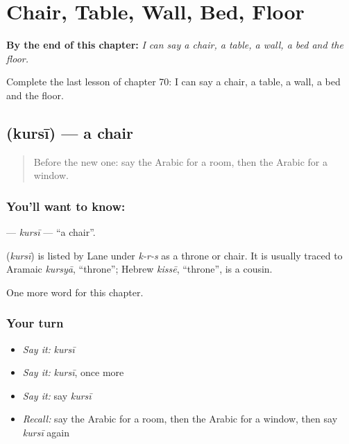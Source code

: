 
\chapter{Chair, Table, Wall, Bed, Floor}
\label{ch:ar-chair-table-wall-bed-floor}

\begin{chapteropening}
\textbf{By the end of this chapter:} \emph{I can say a chair, a table, a wall, a bed and the floor.}

Complete the last lesson of chapter 70: I can say a chair, a table, a wall, a bed and the floor.
\end{chapteropening}

\section[\texorpdfstring{\ar{كرسي} (kursī)}{كرسي (kursī)}]{ (kursī) — a chair}

\label{lesson:AR-C70-kursi}



\begin{quote}
Before the new one: say the Arabic for a room, then the Arabic for a window.
\end{quote}

\subsection*{You'll want to know: }
\textbf{} — \emph{kursī} — \textquotedblleft{}a chair\textquotedblright{}.

\begin{cousinweb}
\textbf{} (\emph{kursī}) is listed by Lane under \emph{k-r-s} as a throne or chair. It is usually traced to Aramaic \emph{kursyā}, \textquotedblleft{}throne\textquotedblright{}; Hebrew \emph{kissē}, \textquotedblleft{}throne\textquotedblright{}, is a cousin.
\end{cousinweb}

\begin{grammarlens}[title={What you've built}]
One more word for this chapter.
\end{grammarlens}

\subsection*{Your turn}
\begin{itemize}
\raggedright
  \item \emph{Say it:} \emph{kursī}
  \item \emph{Say it:} \emph{kursī}, once more
  \item \emph{Say it:} say \emph{kursī}
  \item \emph{Recall:} say the Arabic for a room, then the Arabic for a window, then say \emph{kursī} again
\end{itemize}

